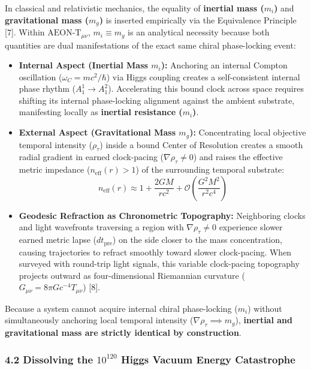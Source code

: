 \documentclass[
]{article}
\providecommand{\tightlist}{%
  \setlength{\itemsep}{0pt}\setlength{\parskip}{0pt}}
\begin{document}
In classical and relativistic mechanics, the equality of
\textbf{inertial mass (\(m_i\))} and \textbf{gravitational mass
(\(m_g\))} is inserted empirically via the Equivalence Principle
{[}7{]}. Within \(\text{AEON-T}_{\mu\nu}\), \(m_i \equiv m_g\) is an
analytical necessity because both quantities are dual manifestations of
the exact same chiral phase-locking event:

\begin{itemize}
\tightlist
\item
  \textbf{Internal Aspect (Inertial Mass \(m_i\)):} Anchoring an
  internal Compton oscillation (\(\omega_C = mc^2/\hbar\)) via Higgs
  coupling creates a self-consistent internal phase rhythm
  (\(A_1^1 \to A_1^2\)). Accelerating this bound clock across space
  requires shifting its internal phase-locking alignment against the
  ambient substrate, manifesting locally as \textbf{inertial resistance
  (\(m_i\))}.
\item
  \textbf{External Aspect (Gravitational Mass \(m_g\)):} Concentrating
  local objective temporal intensity (\(\rho_\tau\)) inside a bound
  Center of Resolution creates a smooth radial gradient in earned
  clock-pacing (\(\nabla\rho_\tau \neq 0\)) and raises the effective
  metric impedance (\(n_{\mathrm{eff}}(r) > 1\)) of the surrounding
  temporal substrate:
  \[n_{\mathrm{eff}}(r) \approx 1 + \frac{2GM}{rc^2} + \mathcal{O}\!\left(\frac{G^2M^2}{r^2c^4}\right)\]
\item
  \textbf{Geodesic Refraction as Chronometric Topography:} Neighboring
  clocks and light wavefronts traversing a region with
  \(\nabla\rho_\tau \neq 0\) experience slower earned metric lapse
  (\(dt_{\mathrm{pre}}\)) on the side closer to the mass concentration,
  causing trajectories to refract smoothly toward slower clock-pacing.
  When surveyed with round-trip light signals, this variable
  clock-pacing topography projects outward as four-dimensional
  Riemannian curvature (\(G_{\mu\nu} = 8\pi G c^{-4} T_{\mu\nu}\))
  {[}8{]}.
\end{itemize}

Because a system cannot acquire internal chiral phase-locking (\(m_i\))
without simultaneously anchoring local temporal intensity
(\(\nabla\rho_\tau \implies m_g\)), \textbf{inertial and gravitational
mass are strictly identical by construction}.

\subsubsection{\texorpdfstring{4.2 Dissolving the \(10^{120}\) Higgs
Vacuum Energy
Catastrophe}{4.2 Dissolving the 10\^{}\{120\} Higgs Vacuum Energy Catastrophe}}\label{dissolving-the-10120-higgs-vacuum-energy-catastrophe}
\end{document}
